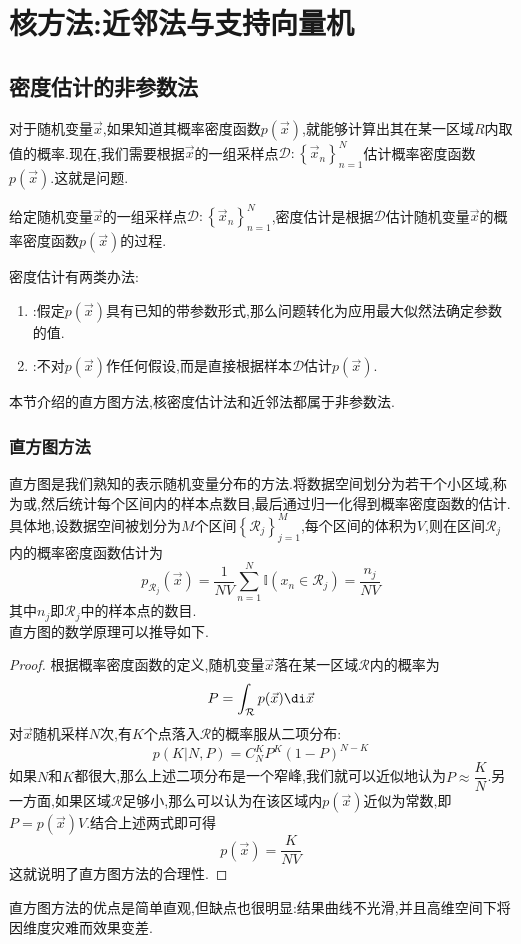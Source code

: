 \documentclass{ctexart}
\begin{document}
\setcounter{FormalCounter}{0}
\section{核方法:近邻法与支持向量机}
\subsection{密度估计的非参数法}
对于随机变量$\vec{x}$,如果知道其概率密度函数$p(\vec{x})$,就能够计算出其在某一区域$R$内取值的概率.现在,我们需要根据$\vec{x}$的一组采样点$\mathcal{D}:\left\{\vec{x}_n\right\}_{n=1}^{N}$估计概率密度函数$p(\vec{x})$.这就是问题.
\begin{definition}[密度估计]
    给定随机变量$\vec{x}$的一组采样点$\mathcal{D}:\left\{\vec{x}_n\right\}_{n=1}^{N}$,密度估计是根据$\mathcal{D}$估计随机变量$\vec{x}$的概率密度函数$p(\vec{x})$的过程.
\end{definition}
密度估计有两类办法:
\begin{enumerate}
    \item {}:假定$p(\vec{x})$具有已知的带参数形式,那么问题转化为应用最大似然法确定参数的值.
    \item {}:不对$p(\vec{x})$作任何假设,而是直接根据样本$\mathcal{D}$估计$p(\vec{x})$.
\end{enumerate}
\indent 本节介绍的直方图方法,核密度估计法和近邻法都属于非参数法.
\subsubsection{直方图方法}
直方图是我们熟知的表示随机变量分布的方法.将数据空间划分为若干个小区域,称为或,然后统计每个区间内的样本点数目,最后通过归一化得到概率密度函数的估计.具体地,设数据空间被划分为$M$个区间$\left\{\mathcal{R}_j\right\}_{j=1}^{M}$,每个区间的体积为$V$,则在区间$\mathcal{R}_j$内的概率密度函数估计为
\[p_{\mathcal{R}_j}(\vec{x})=\frac{1}{NV}\sum_{n=1}^{N}\mathbb{I}(x_n\in \mathcal{R}_j)=\dfrac{n_j}{NV}\]
其中$n_j$即$\mathcal{R}_j$中的样本点的数目.\\
\indent 直方图的数学原理可以推导如下.
\begin{proof}
    根据概率密度函数的定义,随机变量$\vec{x}$落在某一区域$\mathcal{R}$内的概率为
    \[P=\int_{\mathcal{R}}p(\vec{x})\di\vec{x}\]
    对$\vec{x}$随机采样$N$次,有$K$个点落入$\mathcal{R}$的概率服从二项分布:
    \[p\left(K|N,P\right)=C_{N}^{K}P^K(1-P)^{N-K}\]
    如果$N$和$K$都很大,那么上述二项分布是一个窄峰,我们就可以近似地认为$P\approx \dfrac{K}{N}$.另一方面,如果区域$\mathcal{R}$足够小,那么可以认为在该区域内$p(\vec{x})$近似为常数,即$P=p(\vec{x})V$.结合上述两式即可得
    \[p(\vec{x})=\dfrac{K}{NV}\]
    这就说明了直方图方法的合理性.
\end{proof}
直方图方法的优点是简单直观,但缺点也很明显:结果曲线不光滑,并且高维空间下将因维度灾难而效果变差.
\end{document}
